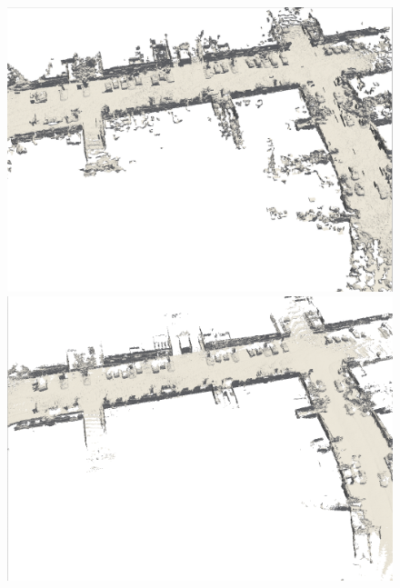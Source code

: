 \begin{figure}[htbp]
        \centering
    \begin{minipage}{0.5\linewidth}
		\centering
		\includegraphics[width=1\linewidth]{figures/kitti_1_shine.png}
	\end{minipage}\hfill
	\begin{minipage}{0.5\linewidth}
		\centering
		\includegraphics[width=1\linewidth]{figures/kitti_1_vdb.png}
	\end{minipage}
    \vfill
    \begin{minipage}{0.5\linewidth}
		\centering

\end{minipage}
\end{figure}
